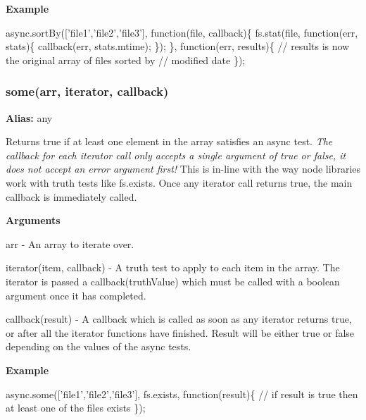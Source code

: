 {\bfseries Example}


\begin{DoxyCode}
async.sortBy([\textcolor{stringliteral}{'file1'},\textcolor{stringliteral}{'file2'},\textcolor{stringliteral}{'file3'}], \textcolor{keyword}{function}(file, callback)\{
    fs.stat(file, \textcolor{keyword}{function}(err, stats)\{
        callback(err, stats.mtime);
    \});
\}, \textcolor{keyword}{function}(err, results)\{
    \textcolor{comment}{// results is now the original array of files sorted by}
    \textcolor{comment}{// modified date}
\});
\end{DoxyCode}
 



\label{_some}%
 \subsubsection*{some(arr, iterator, callback)}

{\bfseries Alias\+:} any

Returns true if at least one element in the array satisfies an async test. {\itshape The callback for each iterator call only accepts a single argument of true or false, it does not accept an error argument first!} This is in-\/line with the way node libraries work with truth tests like fs.\+exists. Once any iterator call returns true, the main callback is immediately called.

{\bfseries Arguments}


\begin{DoxyItemize}
\item arr -\/ An array to iterate over.
\item iterator(item, callback) -\/ A truth test to apply to each item in the array. The iterator is passed a callback(truth\+Value) which must be called with a boolean argument once it has completed.
\item callback(result) -\/ A callback which is called as soon as any iterator returns true, or after all the iterator functions have finished. Result will be either true or false depending on the values of the async tests.
\end{DoxyItemize}

{\bfseries Example}


\begin{DoxyCode}
async.some([\textcolor{stringliteral}{'file1'},\textcolor{stringliteral}{'file2'},\textcolor{stringliteral}{'file3'}], fs.exists, \textcolor{keyword}{function}(result)\{
    \textcolor{comment}{// if result is true then at least one of the files exists}
\});
\end{DoxyCode}
 



